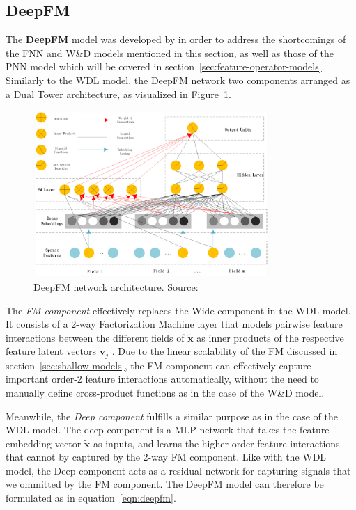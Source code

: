 \documentclass{mldsmsc}
\begin{document}
\subsection{DeepFM}

The \textbf{DeepFM} model was developed by \cite{RefWorks:guo2017deepfm:} in order
to address the shortcomings of the FNN and W\&D models mentioned in this section, as 
well as those of the PNN model which will be covered in section~\ref{sec:feature-operator-models}.
Similarly to the WDL model, the DeepFM network two components arranged as a Dual Tower
architecture, as visualized in Figure~\ref{fig:deepfm}.

\begin{figure}[h]
    \centering
    \includegraphics[width=0.8\textwidth]{../figures/dfm.png}
    \caption{DeepFM network architecture. Source: \citep{RefWorks:shen2017deepctr:}}
    \label{fig:deepfm}
\end{figure}
The \emph{FM component} effectively replaces the Wide component in the WDL model. It consists
of a 2-way Factorization Machine layer that models pairwise feature interactions between the
different fields of $\tilde{\mathbf{x}}$ as inner products of the respective feature latent
vectors $\mathbf{v}_j$ \citep{RefWorks:guo2017deepfm:}. Due to the linear scalability of
the FM discussed in section~\ref{sec:shallow-models}, the FM component can effectively
capture important order-2 feature interactions automatically, without the need to manually
define cross-product functions as in the case of the W\&D model.

Meanwhile, the \emph{Deep component} fulfills a similar purpose as in the case of the WDL
model. The deep component is a MLP network that takes the feature embedding vector $\tilde{\mathbf{x}}$
as inputs, and learns the higher-order feature interactions that cannot by captured by the
2-way FM component. Like with the WDL model, the Deep component acts as a residual network
for capturing signals that we ommitted by the FM component. The DeepFM model can therefore
be formulated as in equation~\ref{eqn:deepfm}.
\end{document}
